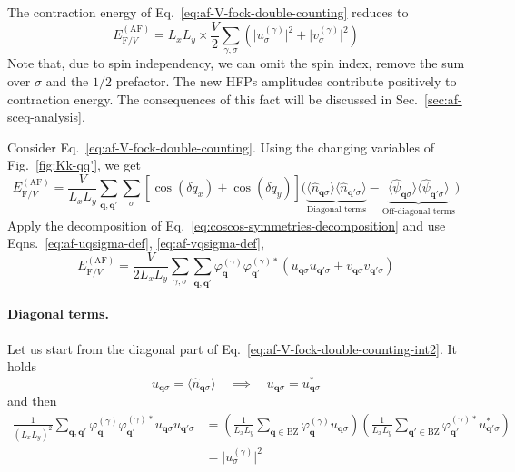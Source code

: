 The contraction energy of Eq.~\eqref{eq:af-V-fock-double-counting} reduces to
\begin{equation}\label{eq:af-HV-fock-Ec}
	E_{\mathrm{F}/V}^{(\mathrm{AF})} = L_x L_y \times \frac{V}{2} \sum_{\gamma,\sigma} \left(
	\big|u^{(\gamma)}_\sigma\big|^2 + \big|v^{(\gamma)}_\sigma\big|^2
	\right)
\end{equation}
Note that, due to spin independency, we can omit the spin index, remove the sum over $\sigma$ and the $1/2$ prefactor. The new HFPs amplitudes contribute positively to contraction energy. The consequences of this fact will be discussed in Sec.~\ref{sec:af-sceq-analysis}.

\begin{tabproof}

	Consider Eq.~\eqref{eq:af-V-fock-double-counting}. Using the changing variables of Fig.~\ref{fig:Kk-qq'}, we get
	\[
	E_{\mathrm{F}/V}^{(\mathrm{AF})} = \frac{V}{L_x L_y} \sum_{\mathbf{q}, \mathbf{q}'} \sum_\sigma \left[
	\cos \left(
	\delta q_x
	\right)	+ \cos \left(
	\delta q_y
	\right)	
	\right]
	\Big(
	\underbrace{
		\langle
		\hat n_{\mathbf{q}\sigma}
		\rangle \langle
		\hat n_{\mathbf{q}'\sigma}
		\rangle
	}_\text{Diagonal terms}
	-
	\underbrace{
		\langle
		\hat \psi_{\mathbf{q}\sigma}
		\rangle \langle
		\hat \psi_{\mathbf{q}'\sigma}
		\rangle
	}_\text{Off-diagonal terms}
	\Big)
	\]
	Apply the decomposition of Eq.~\eqref{eq:coscos-symmetries-decomposition} and use Eqns.~\eqref{eq:af-uqsigma-def}, \eqref{eq:af-vqsigma-def},
	\begin{equation}\label{eq:af-V-fock-double-counting-int2}
		E_{\mathrm{F}/V}^{(\mathrm{AF})} = \frac{V}{2 L_x L_y} \sum_{\gamma,\sigma} \sum_{\mathbf{q}, \mathbf{q}'} \varphi_{\mathbf{q}}^{(\gamma)} \varphi_{\mathbf{q}'}^{(\gamma)*} \left(
		u_{\mathbf{q}\sigma} u_{\mathbf{q}'\sigma} + v_{\mathbf{q}\sigma} v_{\mathbf{q}'\sigma}
		\right)
	\end{equation}
	
	\paragraph{Diagonal terms.}
	
	Let us start from the diagonal part of Eq.~\eqref{eq:af-V-fock-double-counting-int2}. It holds
	\[
		u_{\mathbf{q}\sigma} = \langle
		\hat n_{\mathbf{q}\sigma}
		\rangle
		\quad\implies\quad
		u_{\mathbf{q}\sigma} = u_{\mathbf{q}\sigma}^*
	\]
	and then
	\begin{align}
		\frac{1}{(L_x L_y)^2} \sum_{\mathbf{q}, \mathbf{q}'} \varphi_{\mathbf{q}}^{(\gamma)} \varphi_{\mathbf{q}'}^{(\gamma)*}
		u_{\mathbf{q}\sigma} u_{\mathbf{q}'\sigma} &=
		\left(
		\frac{1}{L_x L_y} \sum_{\mathbf{q}\in\mathrm{BZ}} \varphi_{\mathbf{q}}^{(\gamma)} u_{\mathbf{q}\sigma}
		\right) \left(
		\frac{1}{L_x L_y} \sum_{\mathbf{q}'\in\mathrm{BZ}} \varphi_{\mathbf{q}'}^{(\gamma)*} u_{\mathbf{q}'\sigma}^*
		\right) \nonumber \\
		&= \big|u^{(\gamma)}_\sigma\big|^2 \label{eq:af-HV(diag)-fock-Ec}
	\end{align}
	

\end{tabproof}
